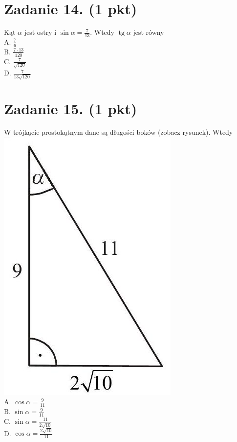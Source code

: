 \documentclass[10pt]{article}
\begin{document}
\section*{Zadanie 14. (1 pkt)}
Kąt \(\alpha\) jest ostry i \(\sin \alpha=\frac{7}{13}\). Wtedy \(\operatorname{tg} \alpha\) jest równy\\
A. \(\frac{7}{6}\)\\
B. \(\frac{7 \cdot 13}{120}\)\\
C. \(\frac{7}{\sqrt{120}}\)\\
D. \(\frac{7}{13 \sqrt{120}}\)

\section*{Zadanie 15. (1 pkt)}
W trójkącie prostokątnym dane są długości boków (zobacz rysunek). Wtedy\\
\includegraphics[max width=\textwidth, center]{2024_11_21_6a8be49478f78d0689cfg-06(1)}\\
A. \(\cos \alpha=\frac{9}{11}\)\\
B. \(\sin \alpha=\frac{9}{11}\)\\
C. \(\sin \alpha=\frac{11}{2 \sqrt{10}}\)\\
D. \(\cos \alpha=\frac{2 \sqrt{10}}{11}\)
\end{document}
